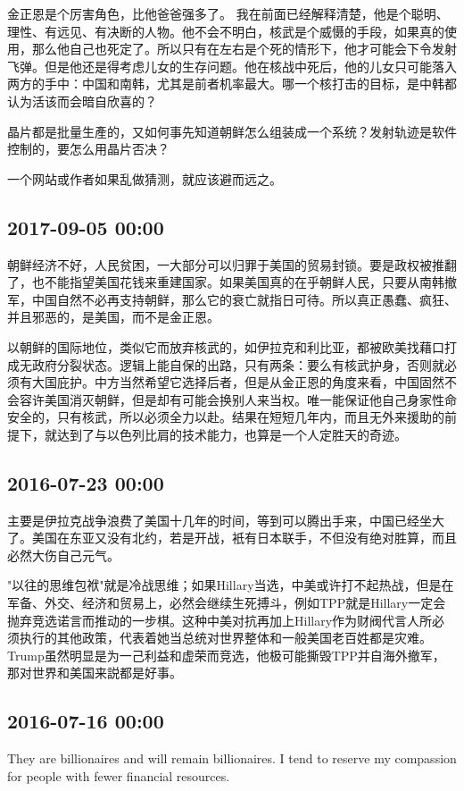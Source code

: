 \documentclass[twocolumn]{ctexart}
\begin{document}
金正恩是个厉害角色，比他爸爸强多了。 我在前面已经解释清楚，他是个聪明、理性、有远见、有决断的人物。他不会不明白，核武是个威慑的手段，如果真的使用，那么他自己也死定了。所以只有在左右是个死的情形下，他才可能会下令发射飞弹。但是他还是得考虑儿女的生存问题。他在核战中死后，他的儿女只可能落入两方的手中：中国和南韩，尤其是前者机率最大。哪一个核打击的目标，是中韩都认为活该而会暗自欣喜的？

晶片都是批量生產的，又如何事先知道朝鲜怎么组装成一个系统？发射轨迹是软件控制的，要怎么用晶片否决？

一个网站或作者如果乱做猜测，就应该避而远之。\subsection*{2017-09-05 00:00}
朝鲜经济不好，人民贫困，一大部分可以归罪于美国的贸易封锁。要是政权被推翻了，也不能指望美国花钱来重建国家。如果美国真的在乎朝鲜人民，只要从南韩撤军，中国自然不必再支持朝鲜，那么它的衰亡就指日可待。所以真正愚蠢、疯狂、并且邪恶的，是美国，而不是金正恩。

以朝鲜的国际地位，类似它而放弃核武的，如伊拉克和利比亚，都被欧美找藉口打成无政府分裂状态。逻辑上能自保的出路，只有两条：要么有核武护身，否则就必须有大国庇护。中方当然希望它选择后者，但是从金正恩的角度来看，中国固然不会容许美国消灭朝鲜，但是却有可能会换别人来当权。唯一能保证他自己身家性命安全的，只有核武，所以必须全力以赴。结果在短短几年内，而且无外来援助的前提下，就达到了与以色列比肩的技术能力，也算是一个人定胜天的奇迹。\subsection*{2016-07-23 00:00}
主要是伊拉克战争浪费了美国十几年的时间，等到可以腾出手来，中国已经坐大了。美国在东亚又没有北约，若是开战，衹有日本联手，不但没有绝对胜算，而且必然大伤自己元气。

"以往的思维包袱"就是冷战思维；如果Hillary当选，中美或许打不起热战，但是在军备、外交、经济和贸易上，必然会继续生死搏斗，例如TPP就是Hillary一定会抛弃竞选诺言而推动的一步棋。这种中美对抗再加上Hillary作为财阀代言人所必须执行的其他政策，代表着她当总统对世界整体和一般美国老百姓都是灾难。Trump虽然明显是为一己利益和虚荣而竞选，他极可能撕毁TPP并自海外撤军，那对世界和美国来説都是好事。\subsection*{2016-07-16 00:00}
They are billionaires and will remain billionaires. I tend to reserve my compassion for people with fewer financial resources.
\end{document}
